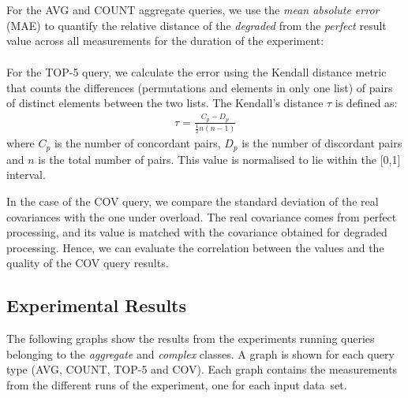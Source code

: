 For the \textnormal{AVG} and \textnormal{COUNT} aggregate 
queries, we use the \emph{mean absolute error} (MAE) to quantify the relative distance of the
\emph{degraded} from the \emph{perfect} result value across all
measurements for the duration of the experiment:
\vspace{-10pt}
\begin{align}
\end{align}

For the \textnormal{TOP-5} query, we calculate the error using the
Kendall distance metric~\cite{kendall} that counts the differences (\ie permutations and
elements in only one list) of pairs of distinct elements between the two
lists. 
The Kendall's distance $\tau$ is defined as:
\begin{align}
\tau = \frac{C_p-D_p}{\frac{1}{2} n (n-1)}
\end{align}
where $C_p$ is the number of concordant pairs, $D_p$ is the number of discordant pairs and $n$ is the
total number of pairs. This value is normalised to lie within the [0,1] interval.

In the case of the \textnormal{COV} query, we compare the standard deviation of the real covariances
with the one under overload. The real covariance comes from perfect processing, and its value is matched
with the covariance obtained for degraded processing. Hence, we can evaluate the correlation between the
\sic values and the quality of the \textnormal{COV} query results.
  
\subsection*{Experimental Results}
The following graphs show the results from the experiments running queries belonging to the
\emph{aggregate} and \emph{complex} classes. A graph is shown for each query type (\textnormal{AVG},
\textnormal{COUNT}, \textnormal{TOP-5} and \textnormal{COV}). Each graph contains the
measurements from the different runs of the experiment, one for each input data~set.

